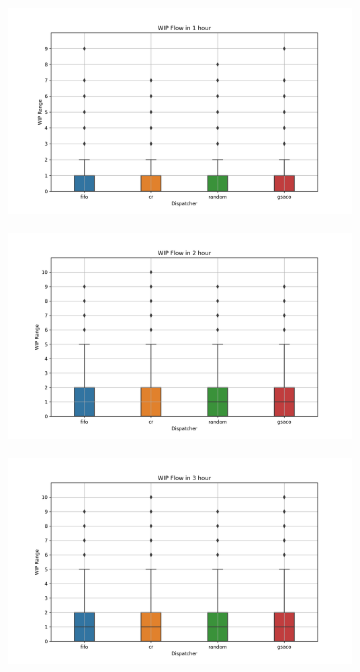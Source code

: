 \begin{figure}[t]
	\centering
	\begin{subfigure}{0.32\textwidth}
		\includegraphics[width=\textwidth]{LVHM/period_3600s.png}
		\caption{}
		\label{fig:p1}
	\end{subfigure}\hfill
	\begin{subfigure}{0.32\textwidth}
		\includegraphics[width=\textwidth]{LVHM/period_7200s.png}
		\caption{}
		\label{fig:p2}
	\end{subfigure}\hfill
	\begin{subfigure}{0.32\textwidth}
		\includegraphics[width=\textwidth]{LVHM/period_10800s.png}

\end{subfigure}
\end{figure}
